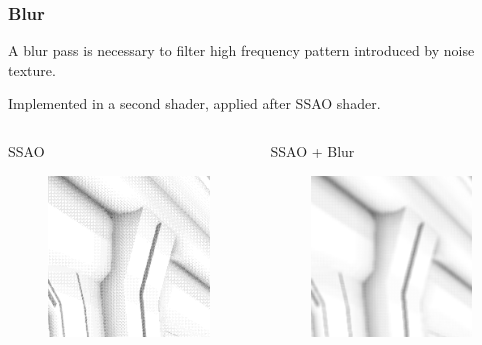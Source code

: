 \documentclass{beamer}
\begin{document}
\begin{frame}
\frametitle{Blur}
A blur pass is necessary to filter high frequency pattern introduced by noise texture.

Implemented in a second shader, applied after SSAO shader.

\vspace{0.6cm}

\begin{columns}
    \begin{column}{0.45\linewidth}
        \centering
        SSAO
        \begin{figure}
            \vspace{-1.8ex}%
            \includegraphics[width=0.7\linewidth]{images/no_blur.png}
        \end{figure}
    \end{column}
    
    \begin{column}{0.45\linewidth}
        \centering
        SSAO + Blur
        \begin{figure}
            \vspace{-1.8ex}%
            \includegraphics[width=0.7\linewidth]{images/blur.png}
        \end{figure}
    \end{column}
\end{columns}

\end{frame}
\end{document}
